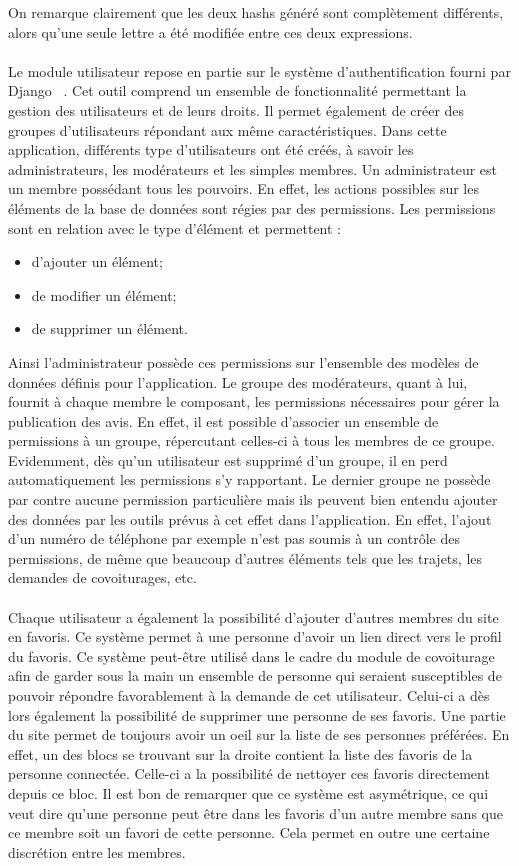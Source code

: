 \documentclass[12pt, a4paper, oneside]{article}
\begin{document}
        On remarque clairement que les deux hashs généré sont complètement différents, alors qu'une seule lettre a été modifiée entre ces deux expressions.\\\\
    \indent Le module utilisateur repose en partie sur le système d'authentification fourni par Django ~\cite{django-auth}. Cet outil comprend un ensemble de fonctionnalité permettant la gestion des utilisateurs et de leurs droits. Il permet également de créer des groupes d'utilisateurs répondant aux même caractéristiques. Dans cette application, différents type d'utilisateurs ont été créés, à savoir les administrateurs, les modérateurs et les simples membres. Un administrateur est un membre possédant tous les pouvoirs. En effet, les actions possibles sur les éléments de la base de données sont régies par des permissions. Les permissions sont en relation avec le type d'élément et permettent :\\
    \begin{itemize}
        \item d'ajouter un élément;
        \item de modifier un élément;
        \item de supprimer un élément.\\
    \end{itemize}
    Ainsi l'administrateur possède ces permissions sur l'ensemble des modèles de données définis pour l'application. Le groupe des modérateurs, quant à lui, fournit à chaque membre le composant, les permissions nécessaires pour gérer la publication des avis. En effet, il est possible d'associer un ensemble de permissions à un groupe, répercutant celles-ci à tous les membres de ce groupe. Evidemment, dès qu'un utilisateur est supprimé d'un groupe, il en perd automatiquement les permissions s'y rapportant. Le dernier groupe ne possède par contre aucune permission particulière mais ils peuvent bien entendu ajouter des données par les outils prévus à cet effet dans l'application. En effet, l'ajout d'un numéro de téléphone par exemple n'est pas soumis à un contrôle des permissions, de même que beaucoup d'autres éléments tels que les trajets, les demandes de covoiturages, etc.\\\\
    \indent Chaque utilisateur a également la possibilité d'ajouter d'autres membres du site en favoris. Ce système permet à une personne d'avoir un lien direct vers le profil du favoris. Ce système peut-être utilisé dans le cadre du module de covoiturage afin de garder sous la main un ensemble de personne qui seraient susceptibles de pouvoir répondre favorablement à la demande de cet utilisateur. Celui-ci a dès lors également la possibilité de supprimer une personne de ses favoris. Une partie du site permet de toujours avoir un oeil sur la liste de ses personnes préférées. En effet, un des blocs se trouvant sur la droite contient la liste des favoris de la personne connectée. Celle-ci a la possibilité de nettoyer ces favoris directement depuis ce bloc. Il est bon de remarquer que ce système est asymétrique, ce qui veut dire qu'une personne peut être dans les favoris d'un autre membre sans que ce membre soit un favori de cette personne. Cela permet en outre une certaine discrétion entre les membres.
\end{document}
